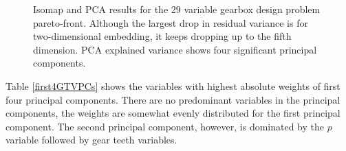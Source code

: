 \begin{figure}[ht]\begin{center}
    \caption{Isomap and PCA results for the 29 variable gearbox design
      problem pareto-front. Although the largest drop in residual variance
      is for two-dimensional embedding, it keeps dropping up to the fifth
      dimension. PCA explained variance shows four significant principal
      components.}
    \label{gtvRvEv}
  \end{center}
\end{figure}


Table \ref{first4GTVPCs} shows the variables with highest absolute weights
of first four principal components. There are no predominant variables in
the principal components, the weights are somewhat evenly distributed for
the first principal component. The second principal component, however, is 
dominated by the $p$ variable followed by gear teeth variables.



